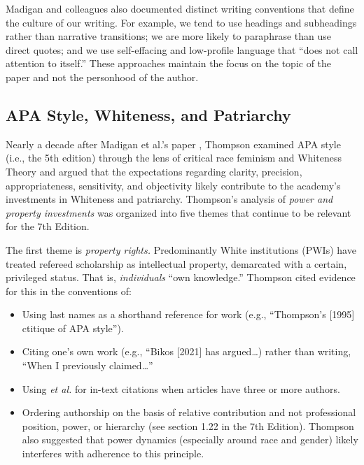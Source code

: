 \documentclass[
  11pt,
]{book}
\providecommand{\tightlist}{%
  \setlength{\itemsep}{0pt}\setlength{\parskip}{0pt}}
\begin{document}
Madigan \citeyearpar{madigan_language_1995} and colleagues also documented distinct writing conventions that define the culture of our writing. For example, we tend to use headings and subheadings rather than narrative transitions; we are more likely to paraphrase than use direct quotes; and we use self-effacing and low-profile language that ``does not call attention to itself.'' These approaches maintain the focus on the topic of the paper and not the personhood of the author.

\hypertarget{apa-style-whiteness-and-patriarchy}{%
\subsection{APA Style, Whiteness, and Patriarchy}\label{apa-style-whiteness-and-patriarchy}}

Nearly a decade after Madigan et al.'s paper \citeyearpar{madigan_language_1995}, Thompson \citeyearpar{thompson_gentlemanly_2004} examined APA style (i.e., the 5th edition) through the lens of critical race feminism and Whiteness Theory and argued that the expectations regarding clarity, precision, appropriateness, sensitivity, and objectivity likely contribute to the academy's investments in Whiteness and patriarchy. Thompson's analysis of \emph{power and property investments} was organized into five themes that continue to be relevant for the 7th Edition.

The first theme is \emph{property rights.} Predominantly White institutions (PWIs) have treated refereed scholarship as intellectual property, demarcated with a certain, privileged status. That is, \emph{individuals} ``own knowledge.'' Thompson \citeyearpar{thompson_gentlemanly_2004} cited evidence for this in the conventions of:

\begin{itemize}
\tightlist
\item
  Using last names as a shorthand reference for work (e.g., ``Thompson's {[}1995{]} ctitique of APA style'').
\item
  Citing one's own work (e.g., ``Bikos {[}2021{]} has argued\ldots) rather than writing, ``When I previously claimed\ldots{}''
\item
  Using \emph{et al.} for in-text citations when articles have three or more authors.
\item
  Ordering authorship on the basis of relative contribution and not professional position, power, or hierarchy (see section 1.22 in the 7th Edition). Thompson \citeyearpar{thompson_gentlemanly_2004} also suggested that power dynamics (especially around race and gender) likely interferes with adherence to this principle.
\end{itemize}
\end{document}
